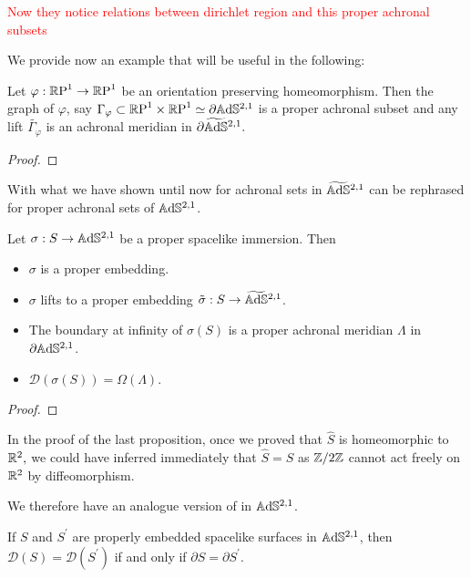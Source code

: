 \textcolor{red}{Now they notice relations between dirichlet region and this proper achronal subsets}

We provide now an example that will be useful in the following:

\begin{lemma}
    Let $\varphi:\mathbb{R}\text{P}^1\to\mathbb{R}\text{P}^1$ be an orientation preserving homeomorphism. Then the graph of $\varphi$, say $\Gamma_\varphi\subset \mathbb{R}\text{P}^1\times\mathbb{R}\text{P}^1\simeq\partial\mathbb{A}\mathrm{d}\mathbb{S}^{2,1}$ is a proper achronal subset and any lift $\tilde{\Gamma_\varphi}$ is an achronal meridian in $\partial\widetilde{\mathbb{A}\mathrm{d}\mathbb{S}}{}^{2,1}.$  
\end{lemma}
\begin{proof}
\end{proof}

With what we have shown until now for achronal sets in $\widetilde{\mathbb{A}\mathrm{d}\mathbb{S}}{}^{2,1}$ can be rephrased for proper achronal sets of $\mathbb{A}\mathrm{d}\mathbb{S}^{2,1}$. \\

\begin{proposition}
    Let $\sigma: S\to\mathbb{A}\mathrm{d}\mathbb{S}^{2,1}$ be a proper spacelike immersion. Then 
    \begin{itemize}
        \item $\sigma$ is a proper embedding.
        \item $\sigma$ lifts to a proper embedding $\tilde{\sigma}:S\to\widetilde{\mathbb{A}\mathrm{d}\mathbb{S}}{}^{2,1}$.
        \item The boundary at infinity of $\sigma(S)$ is a proper achronal meridian $\Lambda$ in $\partial\mathbb{A}\mathrm{d}\mathbb{S}^{2,1}$.
        \item $\mathcal{D}(\sigma(S))=\Omega(\Lambda).$
    \end{itemize}
\end{proposition}

\begin{proof}
\end{proof}

\begin{observation}
    In the proof of the last proposition, once we proved that $\hat{S}$ is homeomorphic to $\mathbb{R}^2,$ we could have inferred immediately that $\hat{S}=S$ as $\mathbb{Z}/2\mathbb{Z}$ cannot act freely on $\mathbb{R}^2$ by diffeomorphism. 
\end{observation}

We therefore have an analogue version of  in $\mathbb{A}\mathrm{d}\mathbb{S}^{2,1}$.

\begin{corollary}
    If $S$ and $S^{\prime}$ are properly embedded spacelike surfaces in $\mathbb{A}\mathrm{d}\mathbb{S}^{2,1}$, then $\mathcal{D}(S)=\mathcal{D}(S^{\prime})$ if and only if $\partial S=\partial S^{\prime}$. 
\end{corollary}

